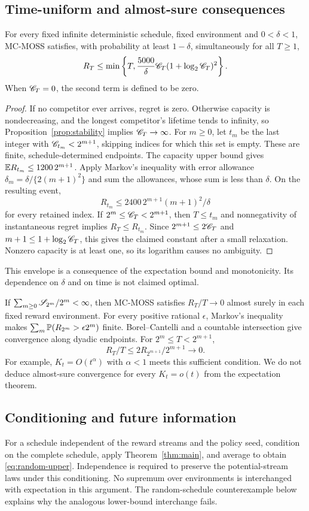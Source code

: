 \subsection{Time-uniform and almost-sure consequences}
\begin{proposition}\label{prop:uniform-envelope}
For every fixed infinite deterministic schedule, fixed environment and $0<\delta<1$, MC-MOSS satisfies, with probability at least $1-\delta$, simultaneously for all $T\ge1$,
\[
 R_T\le\min\left\{T,\frac{5000}{\delta}\mathscr C_T(1+\log_2\mathscr C_T)^2\right\}.
\]
When $\mathscr C_T=0$, the second term is defined to be zero.
\end{proposition}
\begin{proof}
If no competitor ever arrives, regret is zero. Otherwise capacity is nondecreasing, and the longest competitor's lifetime tends to infinity, so Proposition~\ref{prop:stability} implies $\mathscr C_T\to\infty$. For $m\ge0$, let $t_m$ be the last integer with $\mathscr C_{t_m}<2^{m+1}$, skipping indices for which this set is empty. These are finite, schedule-determined endpoints. The capacity upper bound gives $\mathbb E R_{t_m}\le1200\,2^{m+1}$. Apply Markov's inequality with error allowance $\delta_m=\delta/\{2(m+1)^2\}$ and sum the allowances, whose sum is less than $\delta$. On the resulting event,
\[
 R_{t_m}\le2400\,2^{m+1}(m+1)^2/\delta
\]
for every retained index. If $2^m\le\mathscr C_T<2^{m+1}$, then $T\le t_m$ and nonnegativity of instantaneous regret implies $R_T\le R_{t_m}$. Since $2^{m+1}\le2\mathscr C_T$ and $m+1\le1+\log_2\mathscr C_T$, this gives the claimed constant after a small relaxation. Nonzero capacity is at least one, so its logarithm causes no ambiguity.
\end{proof}

This envelope is a consequence of the expectation bound and monotonicity. Its dependence on $\delta$ and on time is not claimed optimal.

If $\sum_{m\ge0}\mathscr S_{2^m}/2^m<\infty$, then MC-MOSS satisfies $R_T/T\to0$ almost surely in each fixed reward environment. For every positive rational $\epsilon$, Markov's inequality makes $\sum_m\mathbb P(R_{2^m}>\epsilon2^m)$ finite. Borel--Cantelli and a countable intersection give convergence along dyadic endpoints. For $2^m\le T<2^{m+1}$,
\[
 R_T/T\le2R_{2^{m+1}}/2^{m+1}\longrightarrow0.
\]
For example, $K_t=O(t^\alpha)$ with $\alpha<1$ meets this sufficient condition. We do not deduce almost-sure convergence for every $K_t=o(t)$ from the expectation theorem.

\subsection{Conditioning and future information}
For a schedule independent of the reward streams and the policy seed, condition on the complete schedule, apply Theorem~\ref{thm:main}, and average to obtain \eqref{eq:random-upper}. Independence is required to preserve the potential-stream laws under this conditioning. No supremum over environments is interchanged with expectation in this argument. The random-schedule counterexample below explains why the analogous lower-bound interchange fails.

